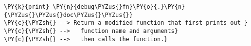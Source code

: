 \begin{Verbatim}[commandchars=\\\{\}]
\PY{k}{print} \PY{n}{debug\PYZus{}fn}\PY{o}{.}\PY{n}{\PYZus{}\PYZus{}doc\PYZus{}\PYZus{}}
\PY{c}{\PYZsh{} --> Return a modified function that first prints out }
\PY{c}{\PYZsh{} -->   function name and arguments}
\PY{c}{\PYZsh{} -->   then calls the function.}
\end{Verbatim}
